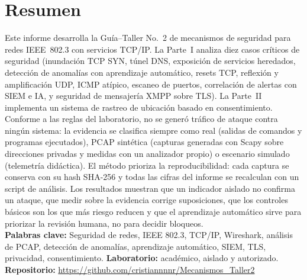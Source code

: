 \chapter*{\centering \Large Resumen}
Este informe desarrolla la Gu\'ia--Taller No.~2 de mecanismos de seguridad para redes IEEE~802.3 con servicios TCP/IP. La Parte~I analiza diez casos cr\'iticos de seguridad (inundaci\'on TCP SYN, t\'unel DNS, exposici\'on de servicios heredados, detecci\'on de anomal\'ias con aprendizaje autom\'atico, resets TCP, reflexi\'on y amplificaci\'on UDP, ICMP at\'ipico, escaneo de puertos, correlaci\'on de alertas con SIEM e IA, y seguridad de mensajer\'ia XMPP sobre TLS). La Parte~II implementa un sistema de rastreo de ubicaci\'on basado en consentimiento. Conforme a las reglas del laboratorio, no se gener\'o tr\'afico de ataque contra ning\'un sistema: la evidencia se clasifica siempre como real (salidas de comandos y programas ejecutados), PCAP sint\'etica (capturas generadas con Scapy sobre direcciones privadas y medidas con un analizador propio) o escenario simulado (telemetr\'ia did\'actica). El m\'etodo prioriza la reproducibilidad: cada captura se conserva con su hash SHA-256 y todas las cifras del informe se recalculan con un script de an\'alisis. Los resultados muestran que un indicador aislado no confirma un ataque, que medir sobre la evidencia corrige suposiciones, que los controles b\'asicos son los que m\'as riesgo reducen y que el aprendizaje autom\'atico sirve para priorizar la revisi\'on humana, no para decidir bloqueos.
~\\[1cm]
\noindent
\textbf{Palabras clave:} Seguridad de redes, IEEE 802.3, TCP/IP, Wireshark, an\'alisis de PCAP, detecci\'on de anomal\'ias, aprendizaje autom\'atico, SIEM, TLS, privacidad, consentimiento.
\vfill
\noindent
\textbf{Laboratorio:} acad\'emico, aislado y autorizado. \quad \textbf{Repositorio:} \url{https://github.com/cristiannnnr/Mecanismos_Taller2}
